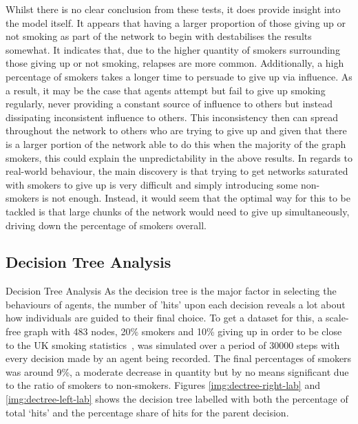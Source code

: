 \documentclass[]{report}
\begin{document}
Whilst there is no clear conclusion from these tests, it does provide insight into the model itself. It appears that having a larger proportion of those giving up or not smoking as part of the network to begin with destabilises the results somewhat. It indicates that, due to the higher quantity of smokers surrounding those giving up or not smoking, relapses are more common. Additionally, a high percentage of smokers takes a longer time to persuade to give up via influence. As a result, it may be the case that agents attempt but fail to give up smoking regularly, never providing a constant source of influence to others but instead dissipating inconsistent influence to others. This inconsistency then can spread throughout the network to others who are trying to give up and given that there is a larger portion of the network able to do this when the majority of the graph smokers, this could explain the unpredictability in the above results. In regards to real-world behaviour, the main discovery is that trying to get networks saturated with smokers to give up is very difficult and simply introducing some non-smokers is not enough. Instead, it would seem that the optimal way for this to be tackled is that large chunks of the network would need to give up simultaneously, driving down the percentage of smokers overall.


\subsection{Decision Tree Analysis}
Decision Tree Analysis
As the decision tree is the major factor in selecting the behaviours of agents, the number of 'hits' upon each decision reveals a lot about how individuals are guided to their final choice. To get a dataset for this, a scale-free graph with 483 nodes, 20\% smokers and 10\% giving up in order to be close to the UK smoking statistics~\cite{NHS-12}\cite{NHS-43}, was simulated over a period of 30000 steps with every decision made by an agent being recorded. The final percentages of smokers was around 9\%, a moderate decrease in quantity but by no means significant due to the ratio of smokers to non-smokers. Figures \ref{img:dectree-right-lab} and \ref{img:dectree-left-lab}  shows the decision tree labelled with both the percentage of total `hits' and the percentage share of hits for the parent decision.
\end{document}
